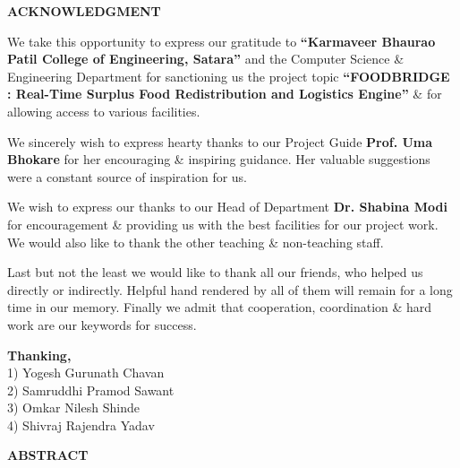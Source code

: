 \documentclass[12pt,a4paper]{article}
\begin{document}
\newpage
\thispagestyle{empty}
\begin{center}
    \vspace*{0.4cm}
    {\Large \textbf{ACKNOWLEDGMENT}}\\[0.8cm]
\end{center}

\noindent
We take this opportunity to express our gratitude to \textbf{“Karmaveer Bhaurao Patil College of Engineering, Satara”} and the Computer Science \& Engineering Department for sanctioning us the project topic \textbf{“FOODBRIDGE : Real-Time Surplus Food Redistribution and Logistics Engine”} \& for allowing access to various facilities.

\vspace{0.4cm}
\noindent
We sincerely wish to express hearty thanks to our Project Guide \textbf{Prof. Uma Bhokare} for her encouraging \& inspiring guidance. Her valuable suggestions were a constant source of inspiration for us.

\vspace{0.4cm}
\noindent
We wish to express our thanks to our Head of Department \textbf{Dr. Shabina Modi} for encouragement \& providing us with the best facilities for our project work. We would also like to thank the other teaching \& non-teaching staff.

\vspace{0.4cm}
\noindent
Last but not the least we would like to thank all our friends, who helped us directly or indirectly. Helpful hand rendered by all of them will remain for a long time in our memory. Finally we admit that cooperation, coordination \& hard work are our keywords for success.

\vspace{2.0cm}
\begin{flushright}
    \textbf{Thanking,}\\[0.3cm]
    1) Yogesh Gurunath Chavan\\[0.1cm]
    2) Samruddhi Pramod Sawant\\[0.1cm]
    3) Omkar Nilesh Shinde\\[0.1cm]
    4) Shivraj Rajendra Yadav\\
\end{flushright}

\newpage
\thispagestyle{empty}
\begin{center}
    \vspace*{0.4cm}
    {\Large \textbf{ABSTRACT}}\\[0.8cm]
\end{center}
\end{document}
